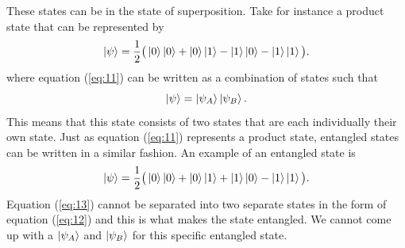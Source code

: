 \documentclass[twocolumn]{article}
\begin{document}
These states can be in the state of superposition. Take for instance a product state that can be represented by
\begin{equation}\label{eq:11}
\ket{\psi}=\frac{1}{2}\big(\ket{0}\ket{0}+\ket{0}\ket{1}-\ket{1}\ket{0}-\ket{1}\ket{1}\big).
\end{equation}
where equation (\ref{eq:11}) can be written as a combination of states such that
\begin{equation}\label{eq:12}
\ket{\psi}=\ket{\psi_A}\ket{\psi_B}.
\end{equation}
This means that this state consists of two states that are each individually their own state. Just as equation (\ref{eq:11}) represents a product state, entangled states can be written in a similar fashion. An example of an entangled state is
\begin{equation}\label{eq:13}
\ket{\psi}=\frac{1}{2}\big(\ket{0}\ket{0}+\ket{0}\ket{1}+\ket{1}\ket{0}-\ket{1}\ket{1}\big).
\end{equation}
Equation (\ref{eq:13}) cannot be separated into two separate states in the form of equation (\ref{eq:12}) and this is what makes the state entangled. We cannot come up with a $\ket{\psi_A}$ and $\ket{\psi_B}$ for this specific entangled state.
\end{document}
